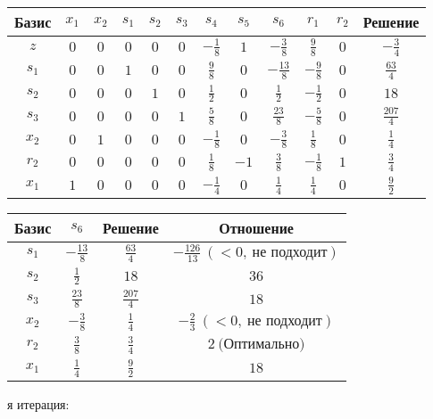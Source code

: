\documentclass{article}%
\begin{document}
\begin{flushleft}
\renewcommand{\arraystretch}{1.3}%
\begin{tabular}{|c|cccccccccc|c|}%
\hline%
Базис&$x_{1}$&$x_{2}$&$s_{1}$&$s_{2}$&$s_{3}$&$s_{4}$&$s_{5}$&$s_{6}$&$r_{1}$&$r_{2}$&Решение\\%
\hline%
$z$&$0$&$0$&$0$&$0$&$0$&$-\frac{1}{8}$&$1$&$-\frac{3}{8}$&$\frac{9}{8}$&$0$&$-\frac{3}{4}$\\%
\hline%
$s_{1}$&$0$&$0$&$1$&$0$&$0$&$\frac{9}{8}$&$0$&$-\frac{13}{8}$&$-\frac{9}{8}$&$0$&$\frac{63}{4}$\\%
$s_{2}$&$0$&$0$&$0$&$1$&$0$&$\frac{1}{2}$&$0$&$\frac{1}{2}$&$-\frac{1}{2}$&$0$&$18$\\%
$s_{3}$&$0$&$0$&$0$&$0$&$1$&$\frac{5}{8}$&$0$&$\frac{23}{8}$&$-\frac{5}{8}$&$0$&$\frac{207}{4}$\\%
$x_{2}$&$0$&$1$&$0$&$0$&$0$&$-\frac{1}{8}$&$0$&$-\frac{3}{8}$&$\frac{1}{8}$&$0$&$\frac{1}{4}$\\%
$r_{2}$&$0$&$0$&$0$&$0$&$0$&$\frac{1}{8}$&$-1$&$\frac{3}{8}$&$-\frac{1}{8}$&$1$&$\frac{3}{4}$\\%
$x_{1}$&$1$&$0$&$0$&$0$&$0$&$-\frac{1}{4}$&$0$&$\frac{1}{4}$&$\frac{1}{4}$&$0$&$\frac{9}{2}$\\%
\hline%
\end{tabular}%
\newline%
\newline%
\newline%
\begin{tabular}{|cccc|}%
\hline%
Базис&$s_{6}$&Решение&Отношение\\%
\hline%
$s_{1}$&$-\frac{13}{8}$&$\frac{63}{4}$&$-\frac{126}{13}\: (< 0, \: \text{не подходит})$\\%
$s_{2}$&$\frac{1}{2}$&$18$&$36$\\%
$s_{3}$&$\frac{23}{8}$&$\frac{207}{4}$&$18$\\%
$x_{2}$&$-\frac{3}{8}$&$\frac{1}{4}$&$-\frac{2}{3}\: (< 0, \: \text{не подходит})$\\%
$r_{2}$&$\frac{3}{8}$&$\frac{3}{4}$&$2\: \text{(Оптимально)}$\\%
$x_{1}$&$\frac{1}{4}$&$\frac{9}{2}$&$18$\\%
\hline%
\end{tabular}%
\newline%
\newline%
я итерация: %
\newline%
\newline%
\renewcommand{\arraystretch}{1.3}%
\begin{tabular}{|c|cccccccccc|c|}%

\end{tabular}
\end{flushleft}
\end{document}
